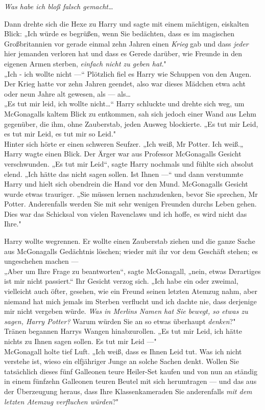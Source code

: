 {\emph{Was habe ich bloß falsch gemacht…}

Dann drehte sich die Hexe zu Harry und sagte mit einem mächtigen, eiskalten Blick: „Ich würde es begrüßen, wenn Sie bedächten, dass es im magischen Großbritannien vor gerade einmal zehn Jahren einen \emph{Krieg} gab und dass \emph{jeder} hier jemanden verloren hat und dass es Gerede darüber, wie Freunde in den eigenen Armen sterben, \emph{einfach nicht zu geben hat}."\\ „Ich - ich wollte nicht ---“ Plötzlich fiel es Harry wie Schuppen von den Augen. Der Krieg hatte vor zehn Jahren geendet, also war dieses Mädchen etwa acht oder neun Jahre alt gewesen, als --- als…\\ „Es tut mir leid, ich wollte nicht…“ Harry schluckte und drehte sich weg, um McGonagalls kaltem Blick zu entkommen, sah sich jedoch einer Wand aus Lehm gegenüber, die ihm, ohne Zauberstab, jeden Ausweg blockierte. „Es tut mir Leid, es tut mir Leid, es tut mir so Leid."\\ Hinter sich hörte er einen schweren Seufzer. „Ich weiß, Mr Potter. Ich weiß.„\\ Harry wagte einen Blick. Der Ärger war aus Professor McGonagalls Gesicht verschwunden. „Es tut mir Leid“, sagte Harry nochmals und fühlte sich absolut elend. „Ich hätte das nicht sagen sollen. Ist Ihnen ---“ und dann verstummte Harry und hielt sich obendrein die Hand vor den Mund. McGonagalls Gesicht wurde etwas trauriger. „Sie müssen lernen nachzudenken, bevor Sie sprechen, Mr Potter. Anderenfalls werden Sie mit sehr wenigen Freunden durchs Leben gehen. Dies war das Schicksal von vielen Ravenclaws und ich hoffe, es wird nicht das Ihre."

Harry wollte wegrennen. Er wollte einen Zauberstab ziehen und die ganze Sache aus McGonagalls Gedächtnis löschen; wieder mit ihr vor dem Geschäft stehen; es ungeschehen machen ---\\ „Aber um Ihre Frage zu beantworten“, sagte McGonagall, „nein, etwas Derartiges ist mir nicht passiert.“ Ihr Gesicht verzog sich. „Ich habe ein oder zweimal, vielleicht auch öfter, gesehen, wie ein Freund seinen letzten Atemzug nahm, aber niemand hat mich jemals im Sterben verflucht und ich dachte nie, dass derjenige mir nicht vergeben würde. \emph{Was in Merlins Namen hat Sie bewegt, so etwas zu sagen, Harry Potter?} Warum würden Sie an so etwas überhaupt \emph{denken}?"\\ Tränen begannen Harrys Wangen hinabzurollen. „Es tut mir Leid, ich hätte nichts zu Ihnen sagen sollen. Es tut mir Leid ---"\\ McGonagall holte tief Luft. „Ich weiß, dass es Ihnen Leid tut. Was ich nicht verstehe ist, wieso ein elfjähriger Junge an solche Sachen denkt. Wollen Sie tatsächlich dieses fünf Galleonen teure Heiler-Set kaufen und von nun an ständig in einem fünfzehn Galleonen teuren Beutel mit sich herumtragen --- und das aus der Überzeugung heraus, dass Ihre Klassenkameraden Sie anderenfalls \emph{mit dem letzten Atemzug verfluchen würden}?"

}
